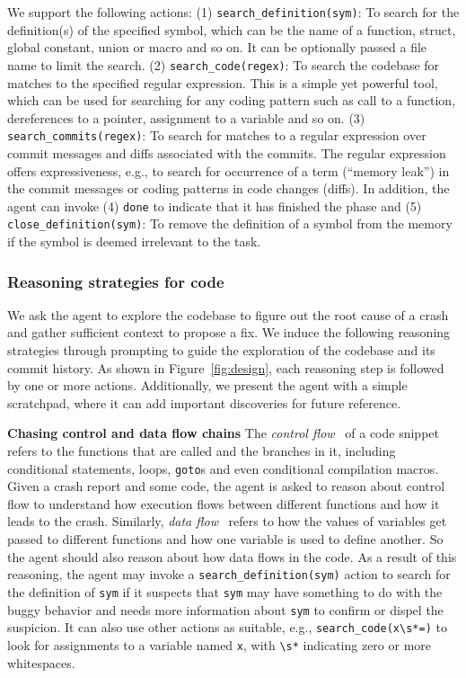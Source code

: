 We support the following actions: (1) \texttt{search\_definition(sym)}: To search for the definition(s) of the specified symbol, which can be the name of a function, struct, global constant, union or macro and so on. It can be optionally passed a file name to limit the search. (2) \texttt{search\_code(regex)}: To search the codebase for matches to the specified regular expression. This is a simple yet powerful tool, which can be used for searching for any coding pattern such as call to a function, dereferences to a pointer, assignment to a variable and so on. (3) \texttt{search\_commits(regex)}: To search for matches to a regular expression over commit messages and diffs associated with the commits. The regular expression offers expressiveness, e.g., to search for occurrence of a term (``memory leak'') in the commit messages or coding patterns in code changes (diffs). In addition, the agent can invoke (4) \texttt{done} to indicate that it has finished the \analysisphase phase and (5) \texttt{close\_definition(sym)}: To remove the definition of a symbol from the memory if the symbol is deemed irrelevant to the task.

\subsubsection{Reasoning strategies for code}

We ask the agent to explore the codebase to figure out the root cause of a crash and gather sufficient context to propose a fix.
We induce the following reasoning strategies through prompting to guide the exploration of the codebase and its commit history. As shown in Figure~\ref{fig:design}, each reasoning step is followed by one or more actions.
Additionally, we present the agent with a simple scratchpad, where it can add important discoveries for future reference.

\noindent\textbf{Chasing control and data flow chains}
The \emph{control flow}~\citep{nielson2015principles} of a code snippet refers to the functions that are called and the branches in it, including conditional statements, loops, \texttt{goto}s and even conditional compilation macros. Given a crash report and some code, the agent is asked to reason about control flow to understand how execution flows between different functions and how it leads to the crash. Similarly, \emph{data flow}~\citep{nielson2015principles} refers to how the values of variables get passed to different functions and how one variable is used to define another. 
So the agent should also reason about how data flows in the code. 
As a result of this reasoning, the agent may invoke a \texttt{search\_definition(sym)} action to search for the definition of \texttt{sym} if it suspects that \texttt{sym} may have something to do with the buggy behavior and needs more information about \texttt{sym} to confirm or dispel the suspicion. It can also use other actions as suitable, e.g., \texttt{search\_code(x\textbackslash{}s*=)} to look for assignments to a variable named \texttt{x}, with \texttt{\textbackslash{}s*} indicating zero or more whitespaces.

